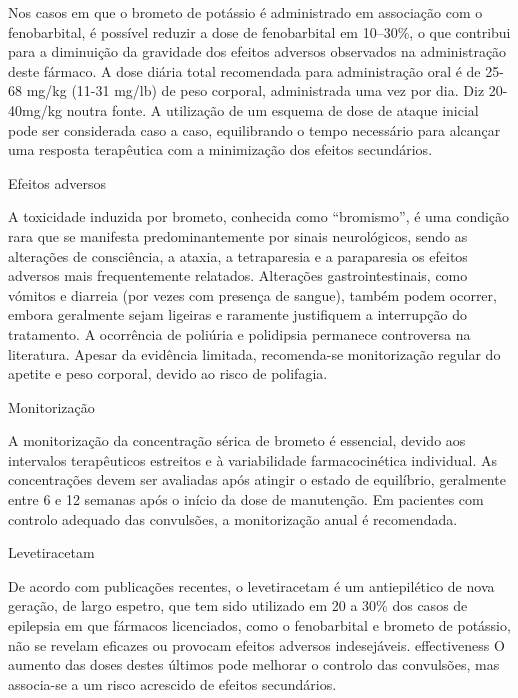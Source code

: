 Nos casos em que o brometo de potássio é administrado em associação com o fenobarbital, é possível reduzir a dose de fenobarbital em 10–30\%, o que contribui para a diminuição da gravidade dos efeitos adversos observados na administração deste fármaco. \cite{Gouveia2024} A dose diária total recomendada para administração oral é de 25-68 mg/kg (11-31 mg/lb) de peso corporal, administrada uma vez por dia. \cite{foi} Diz 20-40mg/kg noutra fonte. A utilização de um esquema de dose de ataque inicial pode ser considerada caso a caso, equilibrando o tempo necessário para alcançar uma resposta terapêutica com a minimização dos efeitos secundários. \cite{foi}


Efeitos adversos


A toxicidade induzida por brometo, conhecida como “bromismo”, é uma condição rara que se manifesta predominantemente por sinais neurológicos, sendo as alterações de consciência, a ataxia, a tetraparesia e a paraparesia os efeitos adversos mais frequentemente relatados. \cite{Fantinati2021} Alterações gastrointestinais, como vómitos e diarreia (por vezes com presença de sangue), também podem ocorrer, embora geralmente sejam ligeiras e raramente justifiquem a interrupção do tratamento. A ocorrência de poliúria e polidipsia permanece controversa na literatura. Apesar da evidência limitada, recomenda-se monitorização regular do apetite e peso corporal, devido ao risco de polifagia.


Monitorização


A monitorização da concentração sérica de brometo é essencial, devido aos intervalos terapêuticos estreitos e à variabilidade farmacocinética individual. \cite{Gouveia2024} As concentrações devem ser avaliadas após atingir o estado de equilíbrio, geralmente entre 6 e 12 semanas após o início da dose de manutenção. \cite{Gouveia2024} Em pacientes com controlo adequado das convulsões, a monitorização anual é recomendada.\cite{Gouveia2024}


Levetiracetam


De acordo com publicações recentes, o levetiracetam é um antiepilético de nova geração, de largo espetro, \cite{Volk2008} que tem sido utilizado em 20 a 30\% dos casos de epilepsia em que fármacos licenciados, como o fenobarbital e brometo de potássio, não se revelam eficazes ou provocam efeitos adversos indesejáveis. \cite{Erath2020} effectiveness\cite{ajvr} O aumento das doses destes últimos pode melhorar o controlo das convulsões, mas associa-se a um risco acrescido de efeitos secundários.\cite{Volk2008}


